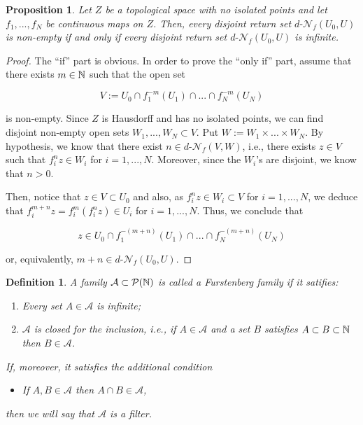 \documentclass[11pt,reqno]{article}
\newtheorem{proposition}[statement]{Proposition}
\newtheorem{definition}[statement]{Definition}
\def\dret{d\text{-}\ret}
\def\ret{\mathcal{N}}
\def\NN{\Bbb N}
\begin{document}
\begin{proposition}\label{prop:ret-set-inf}
Let $Z$ be a topological space with no isolated points and let $f_1,...,f_N$ be continuous maps on $Z$. Then, every disjoint return set  $\dret_f(U_0, U)$ is non-empty if and only if every disjoint return set $\dret_f(U_0, U)$ is infinite.
\end{proposition}
\begin{proof}
The ``if'' part is obvious. In order to prove the ``only if'' part, assume that there exists $m\in \NN$ such that the open set

\begin{equation*}
    V:= U_0\cap f_{1}^{-m}(U_1) \cap... \cap f_{N}^{-m}(U_N)
\end{equation*}

is non-empty. Since $Z$ is Hausdorff and has no isolated points, 
we can find disjoint non-empty open sets  $W_1,...,W_N\subset V$. Put $W:=W_1\times...\times W_N$. By hypothesis, we know that there exist $n\in \dret_f(V,W)$, i.e., there exists $z\in V$ such that $f_i^nz \in W_i$ for $i=1,...,N$. Moreover, since the $W_i$'s are disjoint, we know that $n>0$. 

Then, notice that $z\in V \subset U_0$ and also, as $f_i^nz \in W_i\subset V$ for $i=1,...,N$, we deduce that $f_i^{m+n}z= f_i^m(f_i^nz)\in U_i$ for $i=1,...,N$. Thus, we conclude that

\begin{equation*}
    z\in U_0 \cap f_1^{-(m+n)}(U_1)\cap ...\cap f_N^{-(m+n)}(U_N)
\end{equation*}

or, equivalently, $m+n\in \dret_f(U_0,U)$.
\end{proof}



\begin{definition}
 A family $\mathcal{A}\subset \mathcal{P}(\NN)$ is called a Furstenberg family if it satifies:
 \begin{enumerate}
     \item[\rm (i)] Every set $A\in \mathcal{A}$ is infinite;
     \item[\rm (ii)] $\mathcal{A}$ is closed for the inclusion, i.e., if $A\in \mathcal{A}$ and a set $B$ satisfies $A\subset B \subset \NN$ then $B\in \mathcal{A}$.
 \end{enumerate}
 
 If, moreover, it satisfies the additional condition
 
 \begin{itemize}
     \item[\rm (iii)] If $A,B\in \mathcal{A}$ then $A\cap B\in \mathcal{A}$,
 \end{itemize}
 
 then we will say that $\mathcal{A}$ is a filter.
\end{definition}
\end{document}
